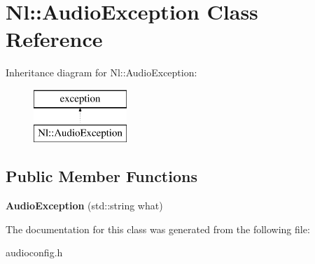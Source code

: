 \hypertarget{classNl_1_1AudioException}{}\section{Nl\+:\+:Audio\+Exception Class Reference}
\label{classNl_1_1AudioException}
Inheritance diagram for Nl\+:\+:Audio\+Exception\+:\begin{figure}[H]
\begin{center}
\leavevmode
\includegraphics[height=2.000000cm]{classNl_1_1AudioException}
\end{center}
\end{figure}
\subsection*{Public Member Functions}
\begin{DoxyCompactItemize}
\item 
\hypertarget{classNl_1_1AudioException_a613956c0943a4c1beb51759433ca1fc6}{}{\bfseries Audio\+Exception} (std\+::string what)\label{classNl_1_1AudioException_a613956c0943a4c1beb51759433ca1fc6}

\end{DoxyCompactItemize}


The documentation for this class was generated from the following file\+:\begin{DoxyCompactItemize}
\item 
audioconfig.\+h\end{DoxyCompactItemize}
